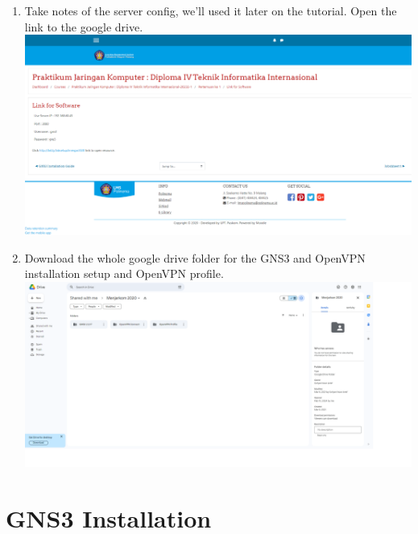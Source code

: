 \documentclass[12pt,titlepage]{article}
\begin{document}
\begin{enumerate}
    \item Take notes of the server config, we'll used it later on the tutorial. Open the link to the google drive. \\ \includegraphics[width=.9\textwidth]{images/figures/lmsslc.polinema.ac.id_mod_url_view.php_id=129800.png}
    \item Download the whole google drive folder for the GNS3 and OpenVPN installation setup and OpenVPN profile. \\ \includegraphics[width=.9\textwidth]{images/figures/drive.google.com_drive_folders_1-SI8APdDK6R4aXmybWSyH4eImjIU0_rt.png}
\end{enumerate}

\newpage

\section{GNS3 Installation}
\end{document}
